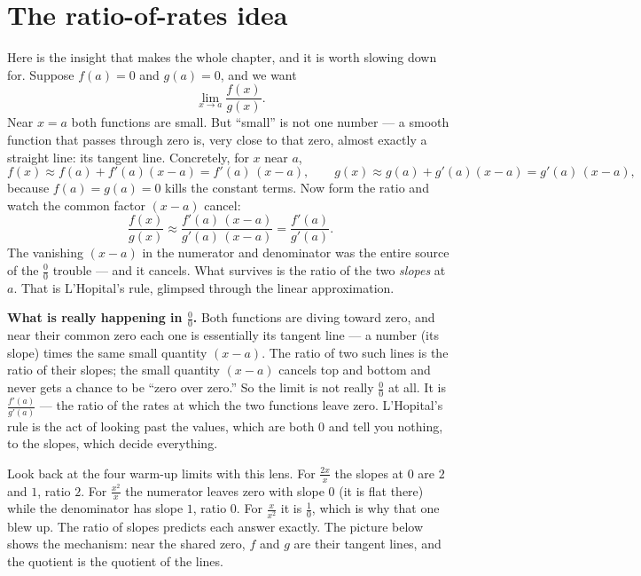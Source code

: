 \section{The ratio-of-rates idea}

Here is the insight that makes the whole chapter, and it is worth slowing down for.
Suppose $f(a)=0$ and $g(a)=0$, and we want
\[
\lim_{x\to a}\frac{f(x)}{g(x)}.
\]
Near $x=a$ both functions are small. But ``small'' is not one number --- a smooth
function that passes through zero is, very close to that zero, almost exactly a
straight line: its tangent line. Concretely, for $x$ near $a$,
\[
f(x)\approx f(a)+f'(a)(x-a)=f'(a)\,(x-a),\qquad
g(x)\approx g(a)+g'(a)(x-a)=g'(a)\,(x-a),
\]
because $f(a)=g(a)=0$ kills the constant terms. Now form the ratio and watch the
common factor $(x-a)$ cancel:
\[
\frac{f(x)}{g(x)}\approx \frac{f'(a)\,(x-a)}{g'(a)\,(x-a)}=\frac{f'(a)}{g'(a)}.
\]
The vanishing $(x-a)$ in the numerator and denominator was the entire source of the
$\tfrac{0}{0}$ trouble --- and it cancels. What survives is the ratio of the two
\emph{slopes} at $a$. That is L'Hopital's rule, glimpsed through the linear
approximation.

\begin{happeningbox}
\textbf{What is really happening in $\tfrac{0}{0}$.} Both functions are diving toward
zero, and near their common zero each one is essentially its tangent line --- a number
(its slope) times the same small quantity $(x-a)$. The ratio of two such lines is the
ratio of their slopes; the small quantity $(x-a)$ cancels top and bottom and never
gets a chance to be ``zero over zero.'' So the limit is not really $\tfrac{0}{0}$ at
all. It is $\tfrac{f'(a)}{g'(a)}$ --- the ratio of the rates at which the two functions
leave zero. L'Hopital's rule is the act of looking past the values, which are both $0$
and tell you nothing, to the slopes, which decide everything.
\end{happeningbox}

Look back at the four warm-up limits with this lens. For $\tfrac{2x}{x}$ the slopes at
$0$ are $2$ and $1$, ratio $2$. For $\tfrac{x^2}{x}$ the numerator leaves zero with
slope $0$ (it is flat there) while the denominator has slope $1$, ratio $0$. For
$\tfrac{x}{x^2}$ it is $\tfrac10$, which is why that one blew up. The ratio of slopes
predicts each answer exactly. The picture below shows the mechanism: near the shared
zero, $f$ and $g$ are their tangent lines, and the quotient is the quotient of the
lines.

